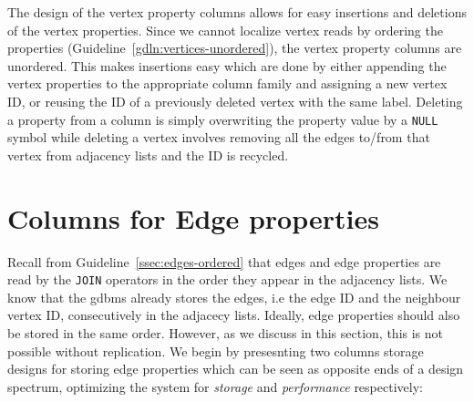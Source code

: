 
The design of the vertex property columns allows for easy insertions and deletions of the vertex properties. Since we cannot localize vertex reads by ordering the properties (Guideline~\ref{gdln:vertices-unordered}), the vertex property columns are unordered. This makes insertions easy which are done by either appending the vertex properties to the appropriate column family and assigning a new vertex ID, or reusing the ID of a previously deleted vertex with the same label. Deleting a property from a column is simply overwriting the property value by a \texttt{NULL} symbol while deleting a vertex involves removing all the edges to/from that vertex from adjacency lists and the ID is recycled. 

\section{Columns for Edge properties}
\label{sec:edge-property-columns}

Recall from Guideline~\ref{ssec:edges-ordered} that edges and edge properties  are read by the \texttt{JOIN} operators in the order they appear in the adjacency lists. We know that the \gls{gdbms} already stores the edges, i.e the edge ID and the neighbour vertex ID, consecutively in the adjacecy lists. Ideally, edge properties should also be stored in the same order. However, as we discuss in this section, this is not possible without replication. We begin by presesnting two columns storage designs for storing edge properties which can be seen as opposite ends of a design spectrum, optimizing the system for \emph{storage} and \emph{performance} respectively:

